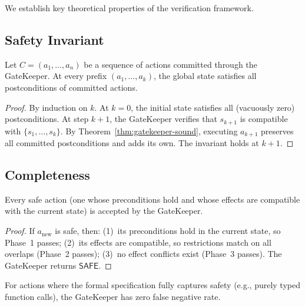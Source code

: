 \documentclass[11pt]{article}
\newcommand{\SafeAction}{\mathsf{SAFE}}
\begin{document}
We establish key theoretical properties of the verification framework.

\subsection{Safety Invariant}\label{subsec:safety}

\begin{theorem}\label{thm:safety}
Let $C = (a_1, \ldots, a_n)$ be a sequence of actions committed through
the GateKeeper.  At every prefix $(a_1, \ldots, a_k)$, the global
state satisfies all postconditions of committed actions.
\end{theorem}

\begin{proof}
By induction on $k$.  At $k = 0$, the initial state satisfies all
(vacuously zero) postconditions.  At step $k+1$, the GateKeeper
verifies that $s_{k+1}$ is compatible with $\{s_1, \ldots, s_k\}$.
By Theorem~\ref{thm:gatekeeper-sound}, executing $a_{k+1}$ preserves
all committed postconditions and adds its own.  The invariant holds
at $k+1$.
\end{proof}

\subsection{Completeness}\label{subsec:completeness}

\begin{theorem}\label{thm:completeness}
Every safe action (one whose preconditions hold and whose effects
are compatible with the current state) is accepted by the GateKeeper.
\end{theorem}

\begin{proof}
If $a_{\mathrm{new}}$ is safe, then: (1)~its preconditions hold in
the current state, so Phase~1 passes; (2)~its effects are compatible,
so restrictions match on all overlaps (Phase~2 passes); (3)~no effect
conflicts exist (Phase~3 passes).  The GateKeeper returns $\SafeAction$.
\end{proof}

\begin{corollary}\label{cor:no-fn}
For actions where the formal specification fully captures safety
(e.g., purely typed function calls), the GateKeeper has zero false
negative rate.
\end{corollary}
\end{document}
